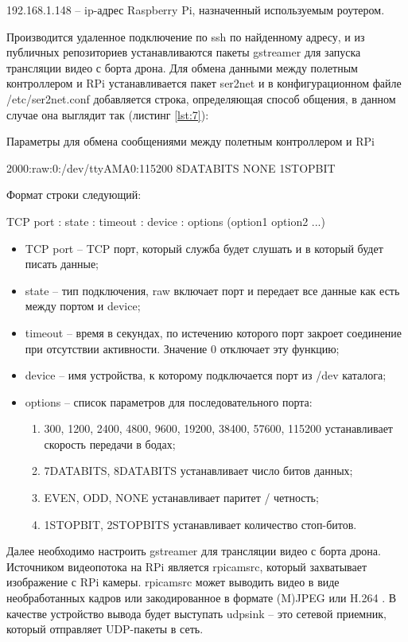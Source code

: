 192.168.1.148 -- ip-адрес Raspberry Pi, назначенный используемым роутером.

Производится удаленное подключение по ssh по найденному адресу, и из публичных репозиториев устанавливаются пакеты gstreamer для запуска трансляции видео с борта дрона.
Для обмена данными между полетным контроллером и RPi устанавливается пакет ser2net и в конфигурационном файле /etc/ser2net.conf добавляется строка, определяющая способ общения, в данном случае она выглядит так (листинг \ref{lst:7}):
\begin{Program}[H]
\caption{Параметры для обмена сообщениями между полетным контроллером и RPi} \label{lst:7}
	\begin{MyCode}
	2000:raw:0:/dev/ttyAMA0:115200 8DATABITS NONE 1STOPBIT
	\end{MyCode}
\end{Program}
Формат строки следующий:

TCP port : state : timeout : device : options (option1 option2 ...)

\begin{itemize}
	\item TCP port -- TCP порт, который служба будет слушать и в который будет писать данные;
	\item state -- тип подключения, raw включает порт и передает все данные как есть между портом и device;
	\item timeout -- время в секундах, по истечению которого порт закроет соединение при отсутствии активности. Значение 0 отключает эту функцию;
	\item device -- имя устройства, к которому подключается порт из /dev каталога;
	\item options -- список параметров для последовательного порта:
	\begin{enumerate}
		 \item 300, 1200, 2400, 4800, 9600, 19200, 38400, 57600, 115200 устанавливает скорость передачи в бодах;
		\item 7DATABITS, 8DATABITS устанавливает число битов данных;
		\item EVEN, ODD, NONE устанавливает паритет / четность;
		\item 1STOPBIT, 2STOPBITS устанавливает количество стоп-битов.
	\end{enumerate}
\end{itemize}

Далее необходимо настроить gstreamer для трансляции видео с борта дрона. Источником видеопотока на RPi является rpi\-cam\-src, который захватывает изображение с RPi камеры. rpi\-cam\-src может выводить видео в виде необработанных кадров или закодированное в формате (M)JPEG или H.264 \cite{gstreamer1}. В качестве устройство вывода будет выступать udpsink -- это сетевой приемник, который отправляет UDP-пакеты в сеть.

